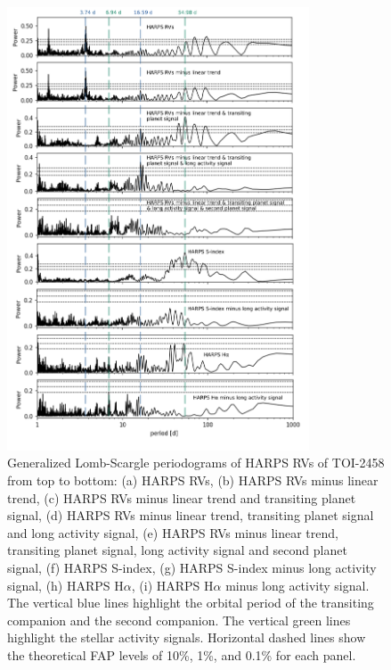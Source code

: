 \documentclass[traditabstract,longauth]{aa}
\begin{document}
\begin{figure}
\centering
\includegraphics[width=0.80\textwidth, trim= {0.0cm 0.0cm 0.0cm 0.0cm}]{figures/periodograms_v2.pdf}
\caption{Generalized Lomb-Scargle periodograms of HARPS RVs of TOI-2458 from top to bottom: (a) HARPS RVs, (b) HARPS RVs minus linear trend, (c) HARPS RVs minus linear trend and transiting planet signal, (d) HARPS RVs minus linear trend, transiting planet signal and long activity signal, (e) HARPS RVs minus linear trend, transiting planet signal, long activity signal and second planet signal, (f) HARPS S-index, (g) HARPS S-index minus long activity signal, (h) HARPS H$\alpha$, (i) HARPS H$\alpha$ minus long activity signal. The vertical blue lines highlight the orbital period of the transiting companion and the second companion. The vertical green lines highlight the stellar activity signals. Horizontal dashed lines show the theoretical FAP levels of 10\%, 1\%, and 0.1\% for each panel.} \label{fig:per}
\end{figure}
\end{document}
